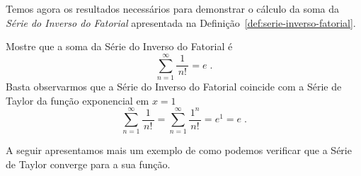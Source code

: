 Temos agora os resultados necessários para demonstrar o cálculo da soma da
\emph{Série do Inverso do Fatorial}
apresentada na Definição~\ref{def:serie-inverso-fatorial}.

\begin{example}
  Mostre que a soma da Série do Inverso do Fatorial é
  \[
    \sum_{n=1}^\infty \frac{1}{\,n!\,} = e    \;.
  \]
  \solution
  Basta observarmos que a Série do Inverso do Fatorial coincide com a
  Série de Taylor da função exponencial em $x=1$
  \[
    \sum_{n=1}^\infty \frac{1  }{\,n!\,} =
    \sum_{n=1}^\infty \frac{1^n}{\,n!\,} = e^1 = e    \;.
  \]
\end{example}

A seguir apresentamos mais um exemplo de como podemos verificar que
a Série de Taylor converge para a sua função.

